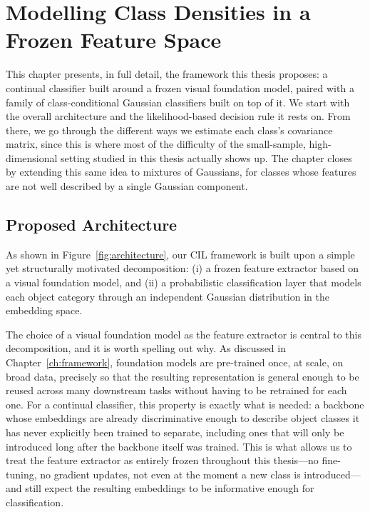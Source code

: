 \chapter{Modelling Class Densities in a Frozen Feature Space}
\label{methodology}

This chapter presents, in full detail, the framework this thesis proposes: a continual classifier built around a frozen visual foundation model, paired with a family of class-conditional Gaussian classifiers built on top of it. We start with the overall architecture and the likelihood-based decision rule it rests on. From there, we go through the different ways we estimate each class's covariance matrix, since this is where most of the difficulty of the small-sample, high-dimensional setting studied in this thesis actually shows up. The chapter closes by extending this same idea to mixtures of Gaussians, for classes whose features are not well described by a single Gaussian component.

\section{Proposed Architecture}

As shown in Figure~\ref{fig:architecture}, our CIL framework is built upon a simple yet structurally motivated decomposition: (i) a frozen feature extractor based on a visual foundation model, and (ii) a probabilistic classification layer that models each object category through an independent Gaussian distribution in the embedding space.

The choice of a visual foundation model as the feature extractor is central to this decomposition, and it is worth spelling out why. As discussed in Chapter~\ref{ch:framework}, foundation models are pre-trained once, at scale, on broad data, precisely so that the resulting representation is general enough to be reused across many downstream tasks without having to be retrained for each one. For a continual classifier, this property is exactly what is needed: a backbone whose embeddings are already discriminative enough to describe object classes it has never explicitly been trained to separate, including ones that will only be introduced long after the backbone itself was trained. This is what allows us to treat the feature extractor as entirely frozen throughout this thesis---no fine-tuning, no gradient updates, not even at the moment a new class is introduced---and still expect the resulting embeddings to be informative enough for classification.

